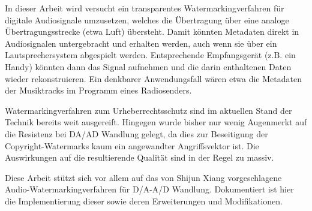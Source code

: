 In dieser Arbeit wird versucht ein transparentes Watermarkingverfahren für digitale Audiosignale umzusetzen, welches die Übertragung über eine analoge Übertragungsstrecke (etwa Luft) übersteht. Damit könnten Metadaten direkt in Audiosignalen untergebracht und erhalten werden, auch wenn sie über ein Lautsprechersystem abgespielt werden. Entsprechende Empfangsgerät (z.B. ein Handy) könnten dann das Signal aufnehmen und die darin enthaltenen Daten wieder rekonstruieren. Ein denkbarer Anwendungsfall wären etwa die Metadaten der Musiktracks im Programm eines Radiosenders.

Watermarkingverfahren zum Urheberrechtsschutz sind im aktuellen Stand der Technik bereits weit ausgereift. Hingegen wurde bisher nur wenig Augenmerkt auf die Resistenz bei DA/AD Wandlung gelegt, da dies zur Beseitigung der Copyright-Watermarks kaum ein angewandter Angriffsvektor ist. Die Auswirkungen auf die resultierende Qualität sind in der Regel zu massiv. 

Diese Arbeit stützt sich vor allem auf das von Shijun Xiang\cite{xiang2007robust} vorgeschlagene Audio-Watermarkingverfahren für D/A-A/D Wandlung. Dokumentiert ist hier die Implementierung dieser sowie deren Erweiterungen und Modifikationen. 


